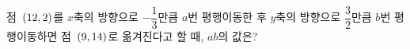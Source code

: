 점~$(12{,}\mkern3mu\mathopen{}2)$를 $x$축의 방향으로 $-\dfrac{1}{3}$만큼 $a$번 평행이동한 후 $y$축의 방향으로 $\dfrac{3}{2}$만큼 $b$번 평행이동하면 점~$(9{,}\mkern3mu\mathopen{}14)$로 옮겨진다고 할 때, $ab$의 값은?
